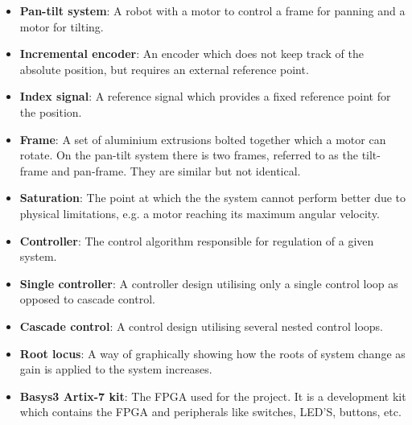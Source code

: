 \documentclass[../../main.tex]{subfiles}
\begin{document}
\label{sec:wordlist}
\begin{itemize}
    \item \textbf{Pan-tilt system}: A robot with a motor to control a frame for panning and a motor for tilting.
    \item \textbf{Incremental encoder}: An encoder which does not keep track of the absolute position, but requires an external reference point.
    \item \textbf{Index signal}: A reference signal which provides a fixed reference point for the position.
    \item \textbf{Frame}: A set of aluminium extrusions bolted together which a motor can rotate. On the pan-tilt system there is two frames, referred to as the tilt-frame and pan-frame. They are similar but not identical.
    \item \textbf{Saturation}: The point at which the the system cannot perform better due to physical limitations, e.g. a motor reaching its maximum angular velocity.
    \item \textbf{Controller}: The control algorithm responsible for regulation of a given system.
    \item \textbf{Single controller}: A controller design utilising only a single control loop as opposed to cascade control.
    \item \textbf{Cascade control}: A control design utilising several nested control loops.
    \item \textbf{Root locus}: A way of graphically showing how the roots of system change as gain is applied to the system increases.
    \item \textbf{Basys3 Artix-7 kit}: The FPGA used for the project. It is a development kit which contains the FPGA and peripherals like switches, LED'S, buttons, etc.

\end{itemize}
\end{document}
